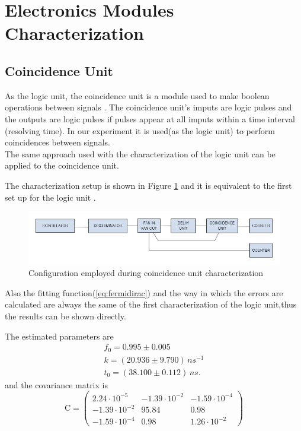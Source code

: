 \documentclass[a4paper, 12pt]{report}
\begin{document}
	
\section{Electronics Modules Characterization}
\subsection{Coincidence Unit}
As the logic unit, the coincidence unit is a module used to make boolean operations between signals . The coincidence unit's imputs are logic pulses and the outputs are logic pulses if pulses appear at all imputs within a time interval (resolving time). In our experiment it is used(as the logic unit) to perform coincidences between signals.\\

The same approach used with the characterization of the logic unit can be applied to the coincidence unit.


The characterization setup is shown in Figure \ref{coinc_unit} and it is equivalent to the first set up for the logic unit . 

\begin{figure}[!h]
	\centering
	\includegraphics[width=\linewidth]{coinc_unit.png}
	\caption{Configuration employed during coincidence unit characterization}
	\label{coinc_unit}
\end{figure}


Also the fitting function(\eqref{eq:fermidirac}) and the way in which the errors are calculated are  always the same of the first characterization of the logic unit,thus the results can be shown directly. 


The estimated parameters are
\begin{eqnarray}
f_0 = 0.995 \pm 0.005\\
k = ( 20.936 \pm 9.790 ) \,  \si{ns^{-1}} \\
t_0 = ( 38.100 \pm 0.112 ) \,  \si{ns} .
\end{eqnarray}
and the covariance matrix is
\begin{equation}
\textrm{C}=\left(
\begin{array}{ccc}
     2.24 \cdot 10^{-5}  &  -1.39\cdot 10^{-2} &  -1.59 \cdot 10^{-4} \\
    -1.39 \cdot 10^{-2} &      95.84  &      0.98\\
    -1.59\cdot 10^{-4}  &       0.98   &    1.26\cdot 10^{-2} 
\end{array}
\right)
\end{equation}
\end{document}
